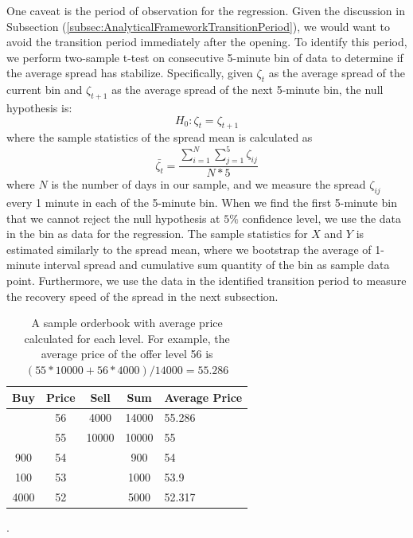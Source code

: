 \documentclass{article}
\begin{document}
One caveat is the period of observation for the regression. Given the discussion in Subsection (\ref{subsec:AnalyticalFrameworkTransitionPeriod}), we would want to avoid the transition period immediately after the opening. To identify this period, we perform two-sample t-test on consecutive 5-minute bin of data to determine if the average spread has stabilize. Specifically, given $\zeta_t$ as the average spread of the current bin and $\zeta_{t+1}$ as the average spread of the next 5-minute bin, the null hypothesis is:
\[
  H_0: \zeta_t = \zeta_{t+1}
\]
where the sample statistics of the spread mean is calculated as
\[
  \bar{\zeta_t} = \frac{\sum_{i=1}^N  \sum_{j=1}^5 \zeta_{ij}}{N*5}
\]
where $N$ is the number of days in our sample, and we measure the spread $\zeta_{ij}$ every 1 minute in each of the 5-minute bin. When we find the first 5-minute bin that we cannot reject the null hypothesis at $5 \%$ confidence level, we use the data in the bin as data for the regression. The sample statistics for $X$ and $Y$ is estimated similarly to the spread mean, where we bootstrap the average of 1-minute interval spread and cumulative sum quantity of the bin as sample data point. Furthermore, we use the data in the identified transition period to measure the recovery speed of the spread in the next subsection.

\begin{table}[h]
  \centering
  \begin{tabular}{|c|c|c|c|l|}
    \hline
    \textbf{Buy} & \textbf{Price} & \textbf{Sell} & \textbf{Sum} & \multicolumn{1}{c|}{\textbf{Average Price}} \\ \hline
                 & 56             & 4000          & 14000        & 55.286                                      \\ \hline
                 & 55             & 10000         & 10000        & 55                                          \\ \hline
    900          & 54             &               & 900          & 54                                          \\ \hline
    100          & 53             &               & 1000         & 53.9                                        \\ \hline
    4000         & 52             &               & 5000         & 52.317                                      \\ \hline
  \end{tabular}
  \caption{A sample orderbook with average price calculated for each level. For example, the average price of the offer level 56 is $(55*10000+56*4000)/14000 = 55.286$}.
  \label{tbl:bookAvgPxConversion}
\end{table}
\end{document}

